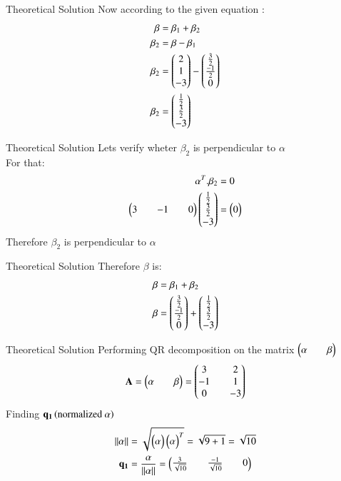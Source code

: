 \documentclass{beamer}
\begin{document}
\begin{frame}{Theoretical Solution}
Now according to the given equation :
\begin{align}
    \beta&=\beta_1+\beta_2\\
    \beta_2&=\beta-\beta_1\\
    \beta_2&=\begin{pmatrix}2\\1\\-3\end{pmatrix}-\begin{pmatrix}\frac{3}{2}\\ \frac{-1}{2}\\0\end{pmatrix}\\
    \beta_2&=\begin{pmatrix}\frac{1}{2}\\ \frac{3}{2}\\-3\end{pmatrix}
\end{align}
\end{frame}
\begin{frame}{Theoretical Solution}
Lets verify wheter $\beta_2$ is perpendicular to $\alpha$\\
For that:
\begin{align}
    \alpha^T.\beta_2&=0\\
    \begin{pmatrix}3&&-1&&0\end{pmatrix}\begin{pmatrix}\frac{1}{2}\\ \frac{3}{2}\\-3\end{pmatrix}&=\begin{pmatrix}0\end{pmatrix}
\end{align}
Therefore $\beta_2$ is perpendicular to $\alpha$
\end{frame}
\begin{frame}{Theoretical Solution}
Therefore $\beta$ is:
\begin{align}
    \beta&=\beta_1+\beta_2\\
    \beta&=\begin{pmatrix}\frac{3}{2}\\ \frac{-1}{2}\\0\end{pmatrix}+\begin{pmatrix}\frac{1}{2}\\ \frac{3}{2}\\-3\end{pmatrix}
\end{align}
\end{frame}
\begin{frame}{Theoretical Solution}
Performing QR decomposition on the matrix $\begin{pmatrix}\alpha&&\beta\end{pmatrix}$
\begin{align}
    \mathbf{A}=\begin{pmatrix}\alpha &&\beta\end{pmatrix}=\begin{pmatrix}3&& 2\\-1 && 1 \\ 0 && -3\end{pmatrix}
\end{align}
Finding $\mathbf{q_1}\left(\text{normalized}\  \alpha\right)$
\begin{align}
    \left\lVert\alpha\right\rVert&=\sqrt{\begin{pmatrix}\alpha\end{pmatrix}\begin{pmatrix}\alpha\end{pmatrix}^T}=\sqrt{9+1}=\sqrt{10}\\
    \mathbf{q_1}&=\frac{\mathbf{\alpha}}{\left\lVert\mathbf{\alpha}\right\rVert}=\begin{pmatrix}\frac{3}{\sqrt{10}}&&\frac{-1}{\sqrt{10}}&&0\end{pmatrix}
\end{align}
\end{frame}
\end{document}
